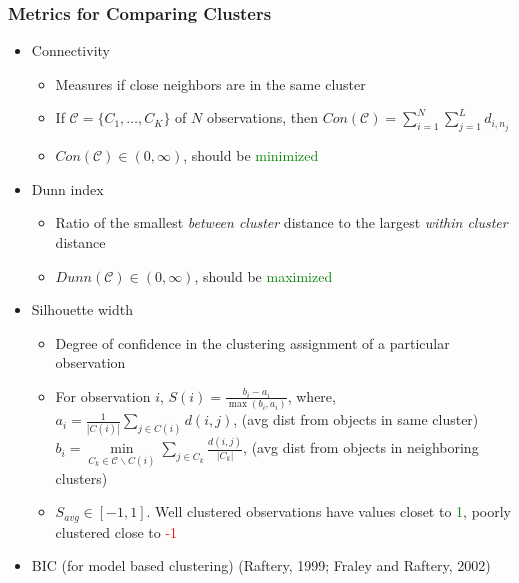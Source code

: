 \documentclass[10pt,dvipsnames,table]{beamer}
\begin{document}
\begin{frame}
\frametitle{Metrics for Comparing Clusters}
\begin{itemize}
\pause \item Connectivity
\begin{itemize}
\item Measures if close neighbors are in the same cluster
\item If $\mathcal{C} = \{C_1, \dots, C_K \}$ of $N$ observations, then $Con(\mathcal{C}) = \sum\limits_{i=1}^{N} \sum\limits_{j=1}^{L} d_{i, n_j}$
\item $Con(\mathcal{C}) \in (0, \infty)$, should be \textcolor{green}{minimized} 
\end{itemize}
\pause \item Dunn index
\begin{itemize}
\item Ratio of the smallest {\emph{between cluster}} distance to the largest {\emph{within cluster}} distance
\item $Dunn(\mathcal{C}) \in (0, \infty)$, should be \textcolor{green}{maximized} 
\end{itemize}
\pause \item Silhouette width
\begin{itemize}
\item Degree of confidence in the clustering assignment of a particular observation
\item For observation $i$, $S(i) = \frac{b_i - a_i}{\max(b_i,a_i)}$, where, \\
$a_i = \frac{1}{|C(i)|}\sum\limits_{j \in C(i)}d(i,j)$, {\footnotesize (avg dist from objects in same cluster)} \\
$b_i = \min \limits_{C_k \in \mathcal{C} \backslash C(i) }\sum\limits_{j \in C_k}\frac{d(i,j)}{|C_k|}$, {\footnotesize(avg dist from objects in neighboring clusters)} \\
\item $S_{avg} \in [-1, 1]$. Well clustered observations have values closet to \textcolor{green}{1}, poorly clustered close to \textcolor{red}{-1}
\end{itemize}
\pause \item BIC (for model based clustering) (Raftery, 1999; Fraley and Raftery, 2002)
\end{itemize}
\end{frame}
\end{document}
